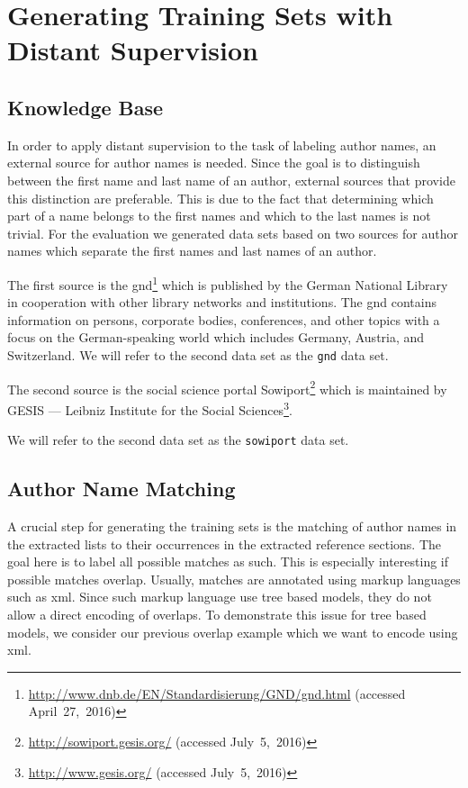 

\section{Generating Training Sets with Distant Supervision}\label{sec:ae-distant-supervision}

\subsection{Knowledge Base}

In order to apply distant supervision to the task of labeling author names, an external source for author names is needed.
Since the goal is to distinguish between the first name and last name of an author, external sources that provide this distinction are preferable.
This is due to the fact that determining which part of a name belongs to the first names and which to the last names is not trivial.
For the evaluation we generated data sets based on two sources for author names which separate the first names and last names of an author.

\bigskip

The first source is the \acrfull{gnd}\footnote{\url{http://www.dnb.de/EN/Standardisierung/GND/gnd.html} (accessed April~27,~2016)} which is published by the German National Library in cooperation with other library networks and institutions.
The \gls{gnd} contains information on persons, corporate bodies, conferences, and other topics with a focus on the German-speaking world which includes Germany, Austria, and Switzerland.
We will refer to the second data set as the \texttt{gnd} data set.

\bigskip

The second source is the social science portal Sowiport\footnote{\url{http://sowiport.gesis.org/} (accessed July~5,~2016)} which is maintained by GESIS --- Leibniz Institute for the Social Sciences\footnote{\url{http://www.gesis.org/} (accessed July~5,~2016)}.


We will refer to the second data set as the \texttt{sowiport} data set.


\subsection{Author Name Matching}\label{subsec:author-name-matching}
A crucial step for generating the training sets is the matching of author names in the extracted lists to their occurrences in the extracted reference sections.
The goal here is to label all possible matches as such.
This is especially interesting if possible matches overlap.
Usually, matches are annotated using markup languages such as \gls{xml}.
Since such markup language use tree based models, they do not allow a direct encoding of overlaps.
To demonstrate this issue for tree based models, we consider our previous overlap example which we want to encode using \gls{xml}\@{}.

